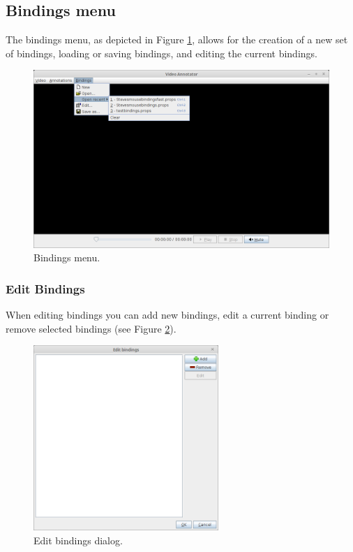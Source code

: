 \documentclass[a4paper]{book}
\begin{document}
\subsection{Bindings menu}
The bindings menu, as depicted in Figure \ref{AnnotatorBindingsMenu}, allows
for the creation of a new set of bindings, loading or saving bindings, and
editing the current bindings.

\begin{figure}[htb]
  \centering
  \includegraphics[width=12.0cm]{images/AnnotatorBindingsMenu.png}
  \caption{Bindings menu.}
  \label{AnnotatorBindingsMenu}
\end{figure}

\subsubsection{Edit Bindings}
When editing bindings you can add new bindings, edit a current binding or
remove selected bindings (see Figure \ref{AnnotationEditBindingsDialog}).

\begin{figure}[htb]
  \centering
  \includegraphics[width=7.0cm]{images/AnnotationEditBindingsDialog.png}
  \caption{Edit bindings dialog.}
  \label{AnnotationEditBindingsDialog}
\end{figure}
\end{document}
